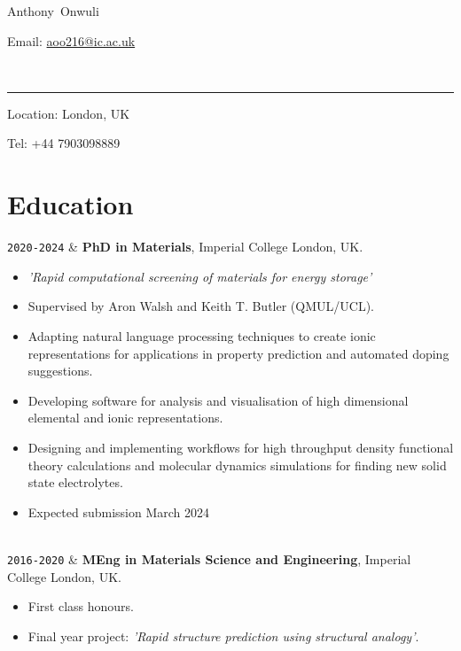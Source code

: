 \documentclass[11pt,a4paper]{article}
\makeatletter
\newcommand{\ICL}{Imperial College London}
\newcommand{\FirstName}{Anthony}
\newcommand{\LastName}{Onwuli}
\newcommand{\MyName}{\FirstName\ \LastName}
\newcommand{\Email}{aoo216@ic.ac.uk}
\newcommand{\PhoneNumber}{+44 7903098889}
\newcommand{\Duration}[2]{\fontsize{10pt}{0}\selectfont \texttt{#1-#2}}
\makeatother
\begin{document}
\begin{minipage}[t]{0.5\textwidth}
  {\fontsize{20pt}{0}\selectfont\MyName}
\end{minipage}
\begin{minipage}[t]{0.5\textwidth}
  \begin{flushright}
    Email: \href{mailto:\Email}{\Email}
  \end{flushright}
\end{minipage}
\\[-0.1cm]
\textcolor{lightgray}{\rule{\textwidth}{3pt}}
\begin{minipage}[t]{0.5\textwidth}
  Location: {London, UK}
\end{minipage}
\begin{minipage}[t]{0.5\textwidth}
  \begin{flushright}
  Tel: \PhoneNumber{}

  \end{flushright}
\end{minipage}
\vspace{-0.3cm}



\section{Education}

\begin{EntriesTableDuration}
  \Duration{2020}{2024}  &
  \textbf{PhD in Materials}, \ICL{}, UK.
  \begin{itemize}
    \item \textit{'Rapid computational screening of materials for energy storage'}
    \item Supervised by Aron Walsh and Keith T. Butler (QMUL/UCL).
    \item Adapting natural language processing techniques to create ionic representations for applications in property prediction and automated doping suggestions.
    \item Developing software for analysis and visualisation of high dimensional elemental and ionic representations.
    \item Designing and implementing workflows for high throughput density functional theory calculations and molecular dynamics simulations for finding new solid state electrolytes.
    \item Expected submission March 2024
  \end{itemize}
  \\
  \Duration{2016}{2020}  &
  \textbf{MEng in Materials Science and Engineering}, \ICL{}, UK.
  \begin{itemize}
    \item First class honours.
    \item Final year project: \textit{'Rapid structure prediction using structural analogy'}.
  \end{itemize}
\end{EntriesTableDuration}
\end{document}
